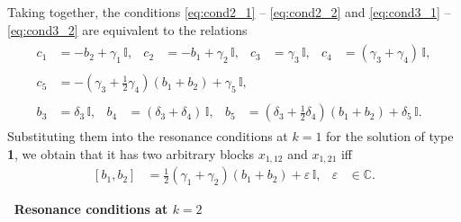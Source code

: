 \documentclass{article}
\theoremstyle{plain}
\newcommand{\brackets}[1]{\left( #1 \right)}
\newcommand{\LieBrackets}[1]{\left[ #1 \right]}
\begin{document}
Taking together, the conditions \eqref{eq:cond2_1} -- \eqref{eq:cond2_2} and \eqref{eq:cond3_1} -- \eqref{eq:cond3_2} are equivalent to the relations
\begin{gather*}
    \begin{aligned}
    c_1
    &= - b_2 + \gamma_1 \, \mathbb{I},
    &
    c_2
    &= - b_1 + \gamma_2 \, \mathbb{I},
    &
    c_3
    &= \gamma_3 \, \mathbb{I},
    &
    c_4
    &= \brackets{\gamma_3 + \gamma_4} \, \mathbb{I},
    \end{aligned}
    \\[1mm]
    \begin{aligned}
    c_5
    &= - \brackets{\gamma_3 + \frac{1}{2} \gamma_4} \brackets{b_1 + b_2} 
    + \gamma_5 \, \mathbb{I},
    \end{aligned}
    \\[1mm]
    \begin{aligned}
    b_3
    &= \delta_3 \, \mathbb{I},
    &
    b_4
    &= \brackets{\delta_3 + \delta_4} \, \mathbb{I},
    &
    b_5
    &= \brackets{\delta_3 + \frac{1}{2} \delta_4} \brackets{b_1 + b_2} 
    + \delta_5 \, \mathbb{I}.
    \end{aligned}
\end{gather*}
Substituting them into the resonance conditions at $k=1$ for the solution of type \textbf{1}, we obtain that it has two arbitrary blocks $x_{1, 12}$ and $x_{1, 21}$ iff
\begin{align} \label{eq:cond1_1}
    &&
    \LieBrackets{b_1, b_2}
    &= \frac{1}{2} \brackets{\gamma_1 + \gamma_2} \brackets{b_1 + b_2} 
    + \varepsilon \, \mathbb{I}, 
    &
    \varepsilon 
    &\in {\mathbb C}.
    &&
\end{align}

\medskip
\textbf{\textbullet \, Resonance conditions at $k = 2$}
\end{document}
